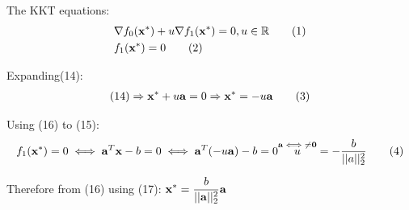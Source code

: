 \documentclass[12pt]{article}
\newcommand\numberthis{\addtocounter{equation}{1}\tag{\theequation}}
\begin{document}
\begin{enumerate}
		The KKT equations:
		\begin{align*}
			&\nabla f_0({\bf x^*})+u\nabla f_1({\bf x^*}) = 0,u\in\mathbb{R}\numberthis\\
			&f_1({\bf x^*})=0 \numberthis
		\end{align*}
		 
		Expanding(14):
		\begin{align*}
			(14)\Rightarrow {\bf x^*}+u{\bf a}=0 \Rightarrow {\bf x^*}=-u{\bf a}\numberthis
		\end{align*}
		
		Using (16) to (15):
		\begin{align*}
			f_1({\bf x^*})=0 \iff {\bf a}^T{\bf x}-b=0 	\iff{\bf a}^T(-u{\bf a}) -b= 0 \overset{{\bf a}{\iff}\ne{\bf 0}} u=-\frac{b}{||a||^2_2}\numberthis
		\end{align*}
	
		Therefore from (16) using (17): $\displaystyle{\bf x^*}=\frac{b}{||{\bf a}||_2^2}{\bf a}$
		

\end{enumerate}
\end{document}
